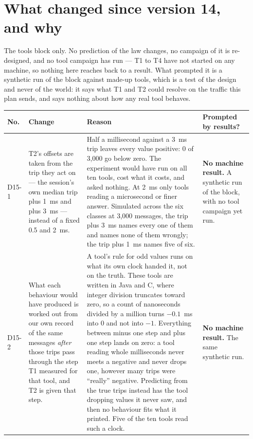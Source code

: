 \documentclass[11pt]{article}
\begin{document}
\section*{What changed since version 14, and why}
The tools block only. No prediction of the law changes, no campaign of it is re-designed, and no
tool campaign has run --- T1 to T4 have not started on any machine, so nothing here reaches back
to a result. What prompted it is a synthetic run of the block against made-up tools, which is a
test of the design and never of the world: it says what T1 and T2 could resolve on the traffic
this plan sends, and says nothing about how any real tool behaves.

{\small
\begin{longtable}{@{}p{1.1cm} >{\raggedright\arraybackslash}p{6.1cm} >{\raggedright\arraybackslash}p{6.0cm} >{\raggedright\arraybackslash}p{2.2cm}@{}}
\toprule
\textbf{No.} & \textbf{Change} & \textbf{Reason} & \textbf{Prompted by results?} \\
\midrule
\endhead
D15-1 & T2's offsets are taken from the trip they act on --- the session's own median trip plus 1~ms and plus 3~ms --- instead of a fixed 0.5 and 2~ms. & Half a millisecond against a 3~ms trip leaves every value positive: 0 of 3,000 go below zero. The experiment would have run on all ten tools, cost what it costs, and asked nothing. At 2~ms only tools reading a microsecond or finer answer. Simulated across the six classes at 3,000 messages, the trip plus 3~ms names every one of them and names none of them wrongly; the trip plus 1~ms names five of six. & \textbf{No machine result.} A synthetic run of the block, with no tool campaign yet run. \\
D15-2 & What each behaviour would have produced is worked out from our own record of the same messages \emph{after} those trips pass through the step T1 measured for that tool, and T2 is given that step. & A tool's rule for odd values runs on what its own clock handed it, not on the truth. These tools are written in Java and C, where integer division truncates toward zero, so a count of nanoseconds divided by a million turns $-0.1$~ms into 0 and not into $-1$. Everything between minus one step and plus one step lands on zero: a tool reading whole milliseconds never meets a negative and never drops one, however many trips were ``really'' negative. Predicting from the true trips instead has the tool dropping values it never saw, and then no behaviour fits what it printed. Five of the ten tools read such a clock. & \textbf{No machine result.} The same synthetic run. \\

\end{longtable}}
\end{document}
